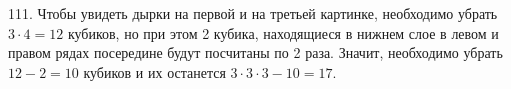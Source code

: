 111. Чтобы увидеть дырки на первой и на третьей картинке, необходимо убрать $3\cdot4=12$ кубиков, но при этом 2 кубика, находящиеся в нижнем слое в левом и правом рядах посередине будут посчитаны по 2 раза. Значит, необходимо убрать $12-2=10$ кубиков и их останется $3\cdot3\cdot3-10=17.$\\
